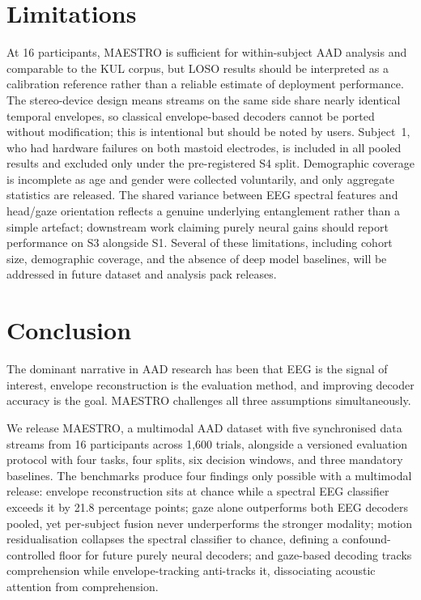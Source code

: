 \documentclass{article}
\begin{document}
\section{Limitations}
\label{sec:limits}

At 16 participants, MAESTRO is sufficient for within-subject AAD analysis and
comparable to the KUL corpus, but LOSO results should be interpreted as a
calibration reference rather than a reliable estimate of deployment
performance. The stereo-device design means streams on the same side share
nearly identical temporal envelopes, so classical envelope-based decoders
cannot be ported without modification; this is intentional but should be
noted by users. Subject~1, who had hardware failures on both mastoid
electrodes, is included in all pooled results and excluded only under the
pre-registered S4 split. Demographic coverage is incomplete as age and gender
were collected voluntarily, and only aggregate statistics are released. The
shared variance between EEG spectral features and head/gaze orientation
reflects a genuine underlying entanglement rather than a simple artefact;
downstream work claiming purely neural gains should report performance on S3
alongside S1. Several of these limitations, including cohort size, demographic
coverage, and the absence of deep model baselines, will be addressed in future
dataset and analysis pack releases.
\section{Conclusion}
\label{sec:conclusion}

The dominant narrative in AAD research has been that EEG is the signal of 
interest, envelope reconstruction is the evaluation method, and improving 
decoder accuracy is the goal. MAESTRO challenges all three assumptions 
simultaneously.

We release MAESTRO, a multimodal AAD dataset with five synchronised data 
streams from 16 participants across 1,600 trials, alongside a versioned 
evaluation protocol with four tasks, four splits, six decision windows, and 
three mandatory baselines. The benchmarks produce four findings only possible 
with a multimodal release: envelope reconstruction sits at chance while a 
spectral EEG classifier exceeds it by 21.8 percentage points; gaze alone 
outperforms both EEG decoders pooled, yet per-subject fusion never 
underperforms the stronger modality; motion residualisation collapses the 
spectral classifier to chance, defining a confound-controlled floor for future 
purely neural decoders; and gaze-based decoding tracks comprehension while 
envelope-tracking anti-tracks it, dissociating acoustic attention from 
comprehension.
\end{document}
